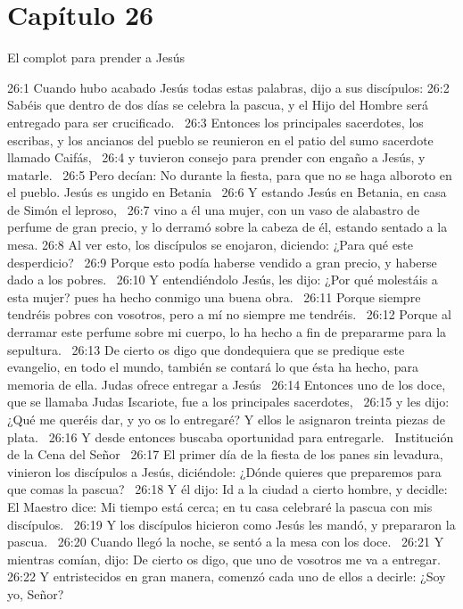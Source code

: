 \section*{Capítulo 26}
El complot para prender a Jesús   

26:1 Cuando hubo acabado Jesús todas estas palabras, dijo a sus discípulos: 
26:2 Sabéis que dentro de dos días se celebra la pascua, y el Hijo del Hombre será entregado para ser crucificado.  
26:3 Entonces los principales sacerdotes, los escribas, y los ancianos del pueblo se reunieron en el patio del sumo sacerdote llamado Caifás,  
26:4 y tuvieron consejo para prender con engaño a Jesús, y matarle.  
26:5 Pero decían: No durante la fiesta, para que no se haga alboroto en el pueblo. 
Jesús es ungido en Betania   
26:6 Y estando Jesús en Betania, en casa de Simón el leproso,  
26:7 vino a él una mujer, con un vaso de alabastro de perfume de gran precio, y lo derramó sobre la cabeza de él, estando sentado a la mesa. 
26:8 Al ver esto, los discípulos se enojaron, diciendo: ¿Para qué este desperdicio?  
26:9 Porque esto podía haberse vendido a gran precio, y haberse dado a los pobres.  
26:10 Y entendiéndolo Jesús, les dijo: ¿Por qué molestáis a esta mujer? pues ha hecho conmigo una buena obra.  
26:11 Porque siempre tendréis pobres con vosotros, pero a mí no siempre me tendréis.  
26:12 Porque al derramar este perfume sobre mi cuerpo, lo ha hecho a fin de prepararme para la sepultura.  
26:13 De cierto os digo que dondequiera que se predique este evangelio, en todo el mundo, también se contará lo que ésta ha hecho, para memoria de ella. 
Judas ofrece entregar a Jesús   
26:14 Entonces uno de los doce, que se llamaba Judas Iscariote, fue a los principales sacerdotes,  
26:15 y les dijo: ¿Qué me queréis dar, y yo os lo entregaré? Y ellos le asignaron treinta piezas de plata.  
26:16 Y desde entonces buscaba oportunidad para entregarle.  
Institución de la Cena del Señor   
26:17 El primer día de la fiesta de los panes sin levadura, vinieron los discípulos a Jesús, diciéndole: ¿Dónde quieres que preparemos para que comas la pascua?  
26:18 Y él dijo: Id a la ciudad a cierto hombre, y decidle: El Maestro dice: Mi tiempo está cerca; en tu casa celebraré la pascua con mis discípulos.  
26:19 Y los discípulos hicieron como Jesús les mandó, y prepararon la pascua.  
26:20 Cuando llegó la noche, se sentó a la mesa con los doce.  
26:21 Y mientras comían, dijo: De cierto os digo, que uno de vosotros me va a entregar.  
26:22 Y entristecidos en gran manera, comenzó cada uno de ellos a decirle: ¿Soy yo, Señor?  
